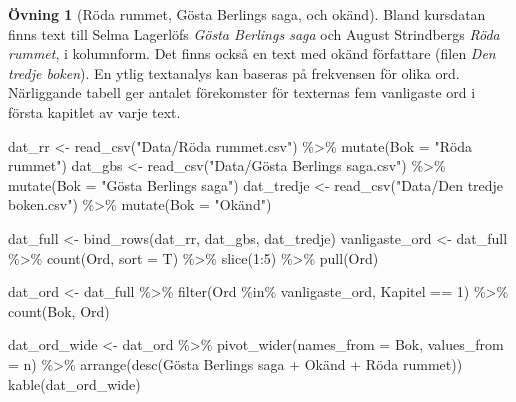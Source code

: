 \documentclass[
]{book}
\newenvironment{Shaded}{\begin{snugshade}}{\end{snugshade}}
\newcommand{\AttributeTok}[1]{\textcolor[rgb]{0.77,0.63,0.00}{#1}}
\newcommand{\DecValTok}[1]{\textcolor[rgb]{0.00,0.00,0.81}{#1}}
\newcommand{\FunctionTok}[1]{\textcolor[rgb]{0.00,0.00,0.00}{#1}}
\newcommand{\NormalTok}[1]{#1}
\newcommand{\OtherTok}[1]{\textcolor[rgb]{0.56,0.35,0.01}{#1}}
\newcommand{\SpecialCharTok}[1]{\textcolor[rgb]{0.00,0.00,0.00}{#1}}
\newcommand{\StringTok}[1]{\textcolor[rgb]{0.31,0.60,0.02}{#1}}
\theoremstyle{definition}
\theoremstyle{definition}
\theoremstyle{definition}
\newtheorem{exercise}{Övning}[chapter]
\theoremstyle{definition}
\theoremstyle{remark}
\begin{document}
\begin{exercise}[Röda rummet, Gösta Berlings saga, och okänd]
Bland kursdatan finns text till Selma Lagerlöfs \emph{Gösta Berlings saga} och August Strindbergs \emph{Röda rummet}, i kolumnform. Det finns också en text med okänd författare (filen \emph{Den tredje boken}). En ytlig textanalys kan baseras på frekvensen för olika ord. Närliggande tabell ger antalet förekomster för texternas fem vanligaste ord i första kapitlet av varje text.

\begin{Shaded}
\begin{Highlighting}[]
\NormalTok{dat\_rr }\OtherTok{\textless{}{-}} \FunctionTok{read\_csv}\NormalTok{(}\StringTok{"Data/Röda rummet.csv"}\NormalTok{) }\SpecialCharTok{\%\textgreater{}\%} 
  \FunctionTok{mutate}\NormalTok{(}\AttributeTok{Bok =} \StringTok{"Röda rummet"}\NormalTok{)}
\NormalTok{dat\_gbs }\OtherTok{\textless{}{-}} \FunctionTok{read\_csv}\NormalTok{(}\StringTok{"Data/Gösta Berlings saga.csv"}\NormalTok{) }\SpecialCharTok{\%\textgreater{}\%} 
  \FunctionTok{mutate}\NormalTok{(}\AttributeTok{Bok =} \StringTok{"Gösta Berlings saga"}\NormalTok{)}
\NormalTok{dat\_tredje }\OtherTok{\textless{}{-}} \FunctionTok{read\_csv}\NormalTok{(}\StringTok{"Data/Den tredje boken.csv"}\NormalTok{) }\SpecialCharTok{\%\textgreater{}\%} 
  \FunctionTok{mutate}\NormalTok{(}\AttributeTok{Bok =} \StringTok{"Okänd"}\NormalTok{)}

\NormalTok{dat\_full }\OtherTok{\textless{}{-}} \FunctionTok{bind\_rows}\NormalTok{(dat\_rr, dat\_gbs, dat\_tredje)}
\NormalTok{vanligaste\_ord }\OtherTok{\textless{}{-}}\NormalTok{ dat\_full }\SpecialCharTok{\%\textgreater{}\%} 
  \FunctionTok{count}\NormalTok{(Ord, }\AttributeTok{sort =}\NormalTok{ T) }\SpecialCharTok{\%\textgreater{}\%}
  \FunctionTok{slice}\NormalTok{(}\DecValTok{1}\SpecialCharTok{:}\DecValTok{5}\NormalTok{) }\SpecialCharTok{\%\textgreater{}\%} 
  \FunctionTok{pull}\NormalTok{(Ord)}

\NormalTok{dat\_ord }\OtherTok{\textless{}{-}}\NormalTok{ dat\_full }\SpecialCharTok{\%\textgreater{}\%} 
  \FunctionTok{filter}\NormalTok{(Ord }\SpecialCharTok{\%in\%}\NormalTok{ vanligaste\_ord, Kapitel }\SpecialCharTok{==} \DecValTok{1}\NormalTok{) }\SpecialCharTok{\%\textgreater{}\%} 
  \FunctionTok{count}\NormalTok{(Bok, Ord) }

\NormalTok{dat\_ord\_wide }\OtherTok{\textless{}{-}}\NormalTok{ dat\_ord }\SpecialCharTok{\%\textgreater{}\%} 
  \FunctionTok{pivot\_wider}\NormalTok{(}\AttributeTok{names\_from =}\NormalTok{ Bok, }\AttributeTok{values\_from =}\NormalTok{ n) }\SpecialCharTok{\%\textgreater{}\%} 
  \FunctionTok{arrange}\NormalTok{(}\FunctionTok{desc}\NormalTok{(}\StringTok{\textasciigrave{}}\AttributeTok{Gösta Berlings saga}\StringTok{\textasciigrave{}} \SpecialCharTok{+}\NormalTok{ Okänd }\SpecialCharTok{+} \StringTok{\textasciigrave{}}\AttributeTok{Röda rummet}\StringTok{\textasciigrave{}}\NormalTok{))}
\FunctionTok{kable}\NormalTok{(dat\_ord\_wide)}
\end{Highlighting}
\end{Shaded}


\end{exercise}
\end{document}
